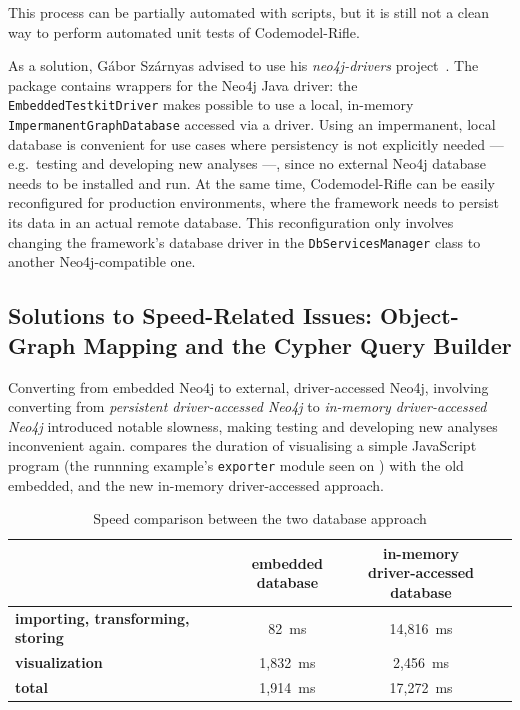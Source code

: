 This process can be partially automated with scripts, but it is still not a clean way to perform automated unit tests of Codemodel-Rifle.

As a solution, Gábor Szárnyas advised to use his \emph{neo4j-drivers} project~\cite{neo4j-drivers}. The package contains wrappers for the Neo4j Java driver: the \lstinline{EmbeddedTestkitDriver} makes possible to use a local, in-memory \lstinline{ImpermanentGraphDatabase} accessed via a driver. Using an impermanent, local database is convenient for use cases where persistency is not explicitly needed — e.g.\ testing and developing new analyses —, since no external Neo4j database needs to be installed and run. At the same time, Codemodel-Rifle can be easily reconfigured for production environments, where the framework needs to persist its data in an actual remote database. This reconfiguration only involves changing the framework's database driver in the \lstinline{DbServicesManager} class to another Neo4j-compatible one.


\subsection{Solutions to Speed-Related Issues: Object-Graph Mapping and the Cypher Query Builder}

Converting from embedded Neo4j to external, driver-accessed Neo4j, involving converting from \emph{persistent driver-accessed Neo4j} to \emph{in-memory driver-accessed Neo4j} introduced notable slowness, making testing and developing new analyses inconvenient again.  compares the duration of visualising a simple JavaScript program (the runnning example's \lstinline{exporter} module seen on ) with the old embedded, and the new in-memory driver-accessed approach.

\vspace*{-1mm}
\begin{table}[!htb]
	\centering
	\begin{tabular}{l|cc}
		\toprule
																								& \shortstack{\textbf{embedded} \\ \textbf{database}}
																								& \shortstack{\textbf{in-memory} \\ \textbf{driver-accessed database}}
																								\\
		\midrule
		\textbf{importing, transforming, storing}   &   82~ms      &   14,816~ms   \\
		\textbf{visualization}                      &   1,832~ms   &   2,456~ms    \\
		\midrule
		\textbf{total}                              &   1,914~ms   &   17,272~ms   \\
		\bottomrule
	\end{tabular}

	\caption[Speed comparison between the two database approach]{Speed comparison between the two database approach\footnotemark}
	\label{table:embedded-vs-in-memory-remote-table}
\end{table}

